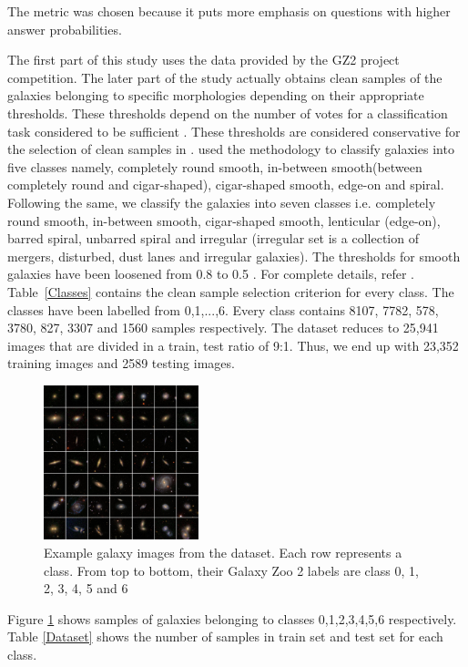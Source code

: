 \documentclass[fleqn,usenatbib]{mnras}
\begin{document}
The metric was chosen because it puts more emphasis on questions with higher answer probabilities. 

\begin{center}
    
\end{center}
\hspace{0.25 in}The first part of this study uses the data provided by the GZ2 project competition. The later part of the study actually obtains clean samples of the galaxies belonging to specific morphologies depending on their appropriate thresholds. These thresholds depend on the number of votes for a classification task considered to be sufficient \citep{dai2018galaxy}. These thresholds are considered conservative for the selection of clean samples in \citet{Willett_2013}. \citet{dai2018galaxy} used the methodology to classify galaxies into five classes namely, completely round smooth, in-between smooth(between completely round and cigar-shaped), cigar-shaped smooth, edge-on and spiral. Following the same, we classify the galaxies into seven classes i.e. completely round smooth, in-between smooth, cigar-shaped smooth, lenticular (edge-on), barred spiral, unbarred spiral and irregular (irregular set is a collection of mergers, disturbed, dust lanes and irregular galaxies). The thresholds for smooth galaxies have been loosened from 0.8 to 0.5 \citep{dai2018galaxy}. For complete details, refer \citet{Willett_2013}. Table~\ref{Classes} contains the clean sample selection criterion for every class. The classes have been labelled from 0,1,...,6. Every class contains 8107, 7782, 578, 3780, 827, 3307 and 1560 samples respectively. The dataset reduces to 25,941 images that are divided in a train, test ratio of 9:1. Thus, we end up with 23,352 training images and 2589 testing images.
\begin{center}
    
\end{center}
\begin{figure}
    \centering
    \includegraphics[width=0.4\textwidth]{images/samples.jpg}
    \caption{Example galaxy images from the dataset. Each row represents a class. From top to bottom, their Galaxy Zoo 2 labels are class 0, 1, 2, 3, 4, 5 and 6}
    \label{sample_images}
\end{figure}
\hspace{0.25 in}Figure \ref{sample_images} shows samples of galaxies belonging to classes 0,1,2,3,4,5,6 respectively. Table \ref{Dataset} shows the number of samples in train set and test set for each class. 
\end{document}
